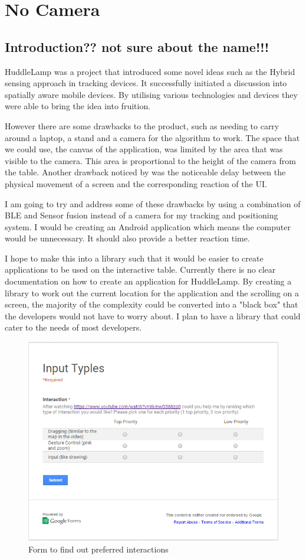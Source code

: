 \chapter{No Camera}

\label{ch:no_camera}

\section{Introduction?? not sure about the name!!!}
HuddleLamp was a project that introduced some novel ideas such as the Hybrid sensing approach in tracking devices. It successfully initiated a discussion into spatially aware mobile devices. By utilising various technologies and devices they were able to bring the idea into fruition. 

However there are some drawbacks to the product, such as needing to carry around a laptop, a stand and a camera for the algorithm to work. The space that we could use, the canvas of the application, was limited by the area that was visible to the camera. This area is proportional to the height of the camera from the table. Another drawback noticed by \citeauthor{huddelamp-paper} was the noticeable delay between the physical movement of a screen and the corresponding reaction of the UI\cite{huddelamp-paper}. 

I am going to try and address some of these drawbacks by using a combination of BLE and Sensor fusion instead of a camera for my tracking and positioning system. I would be creating an Android application which means the computer would be unnecessary. It should also provide a better reaction time. 

I hope to make this into a library such that it would be easier to create applications to be used on the interactive table. Currently there is no clear documentation on how to create an application for HuddleLamp. By creating a library to work out the current location for the application and the scrolling on a screen, the majority of the complexity could be converted into a "black box" that the developers would not have to worry about. I plan to have a library that could cater to the needs of most developers. 

\begin{figure}[h]
  \includegraphics[scale=0.7]{images/googleform}
  \protect\caption{Form to find out preferred interactions} 
  \label{googleform}
\end{figure}